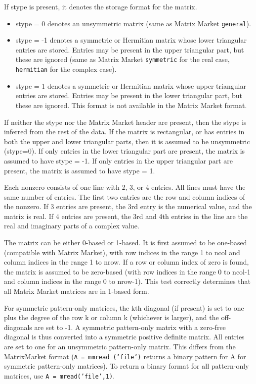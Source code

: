 \documentclass[11pt]{article}
\begin{document}
If stype is present, it denotes the storage format for the matrix.
\begin{itemize}
\item stype = 0 denotes an unsymmetric matrix (same as Matrix Market {\tt general}).
\item stype = -1 denotes a symmetric or Hermitian matrix whose lower triangular
        entries are stored.  Entries may be present in the upper triangular
        part, but these are ignored (same as Matrix Market {\tt symmetric}
        for the real case, {\tt hermitian} for the complex case).
\item stype = 1 denotes a symmetric or Hermitian matrix whose upper triangular
        entries are stored.  Entries may be present in the lower triangular
        part, but these are ignored.  This format is not available in the Matrix
        Market format.
\end{itemize}

If neither the stype nor the Matrix Market header are present, then the stype
is inferred from the rest of the data.  If the matrix is rectangular, or has
entries in both the upper and lower triangular parts, then it is assumed to be
unsymmetric (stype=0).  If only entries in the lower triangular part are
present, the matrix is assumed to have stype = -1.  If only entries in the
upper triangular part are present, the matrix is assumed to have stype = 1.

Each nonzero consists of one line with 2, 3, or 4 entries.  All lines must have
the same number of entries.  The first two entries are the row and column
indices of the nonzero.  If 3 entries are present, the 3rd entry is the
numerical value, and the matrix is real.  If 4 entries are present, the 3rd and
4th entries in the line are the real and imaginary parts of a complex value.

The matrix can be either 0-based or 1-based.  It is first assumed to be
one-based (compatible with Matrix Market), with row indices in the range 1 to
ncol and column indices in the range 1 to nrow.  If a row or column index of
zero is found, the matrix is assumed to be zero-based (with row indices in the
range 0 to ncol-1 and column indices in the range 0 to nrow-1).  This test
correctly determines that all Matrix Market matrices are in 1-based form.

For symmetric pattern-only matrices, the kth diagonal (if present) is set to
one plus the degree of the row k or column k (whichever is larger), and the
off-diagonals are set to -1.  A symmetric pattern-only matrix with a zero-free
diagonal is thus converted into a symmetric positive definite matrix.  All
entries are set to one for an unsymmetric pattern-only matrix.  This differs
from the MatrixMarket format ({\tt A = mmread ('file')} returns a binary
pattern for A for symmetric pattern-only matrices).  To return a binary format
for all pattern-only matrices, use {\tt A = mread('file',1)}.
\end{document}
